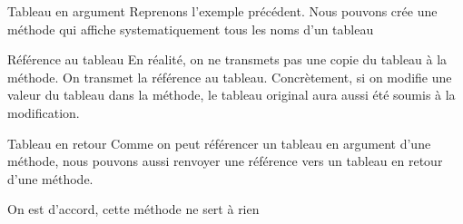 \begin{frame}{Tableau en argument}
    Reprenons l'exemple précédent. Nous pouvons crée une méthode qui affiche systematiquement tous les noms d'un tableau
    

    \begin{alertblock}{Référence au tableau}
        En réalité, on ne transmets pas une copie du tableau à la méthode. On transmet la référence au tableau.
        Concrètement, si on modifie une valeur du tableau dans la méthode,
        le tableau original aura aussi été soumis à la modification.
    \end{alertblock}
\end{frame}

\begin{frame}{Tableau en retour}
    Comme on peut référencer un tableau en argument d'une méthode,
    nous pouvons aussi renvoyer une référence vers un tableau en retour d'une méthode.
    

    \center\tiny On est d'accord, cette méthode ne sert à rien
\end{frame}